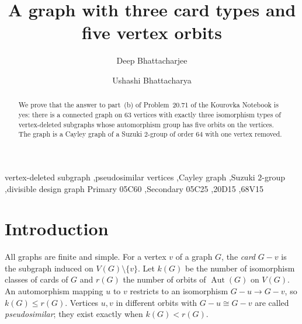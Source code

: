 \documentclass[preprint,12pt]{elsarticle}
\theoremstyle{definition}
\newcommand{\Aut}{\operatorname{Aut}}
\begin{document}
\begin{frontmatter}

\title{A graph with three card types and five vertex orbits}

\author[egspl,ucal]{Deep Bhattacharjee}

\author[ntu]{Ushashi Bhattacharya}

\begin{abstract}
We prove that the answer to part~(b) of Problem~20.71 of the Kourovka Notebook is yes: there is a connected graph on $63$ vertices with exactly three isomorphism types of vertex-deleted subgraphs whose automorphism group has five orbits on the vertices. The graph is a Cayley graph of a Suzuki $2$-group of order $64$ with one vertex removed.
\end{abstract}

\begin{keyword}
vertex-deleted subgraph \sep pseudosimilar vertices \sep Cayley graph \sep Suzuki $2$-group \sep divisible design graph
\MSC[2020] Primary 05C60 \sep Secondary 05C25 \sep 20D15 \sep 68V15
\end{keyword}

\end{frontmatter}

\section{Introduction}\label{sec:intro}

All graphs are finite and simple. For a vertex $v$ of a graph $G$, the \emph{card} $G-v$ is the subgraph induced on $V(G)\setminus\{v\}$. Let $k(G)$ be the number of isomorphism classes of cards of $G$ and $r(G)$ the number of orbits of $\Aut(G)$ on $V(G)$. An automorphism mapping $u$ to $v$ restricts to an isomorphism $G-u\to G-v$, so $k(G)\le r(G)$. Vertices $u,v$ in different orbits with $G-u\cong G-v$ are called \emph{pseudosimilar}; they exist exactly when $k(G)<r(G)$.
\end{document}
